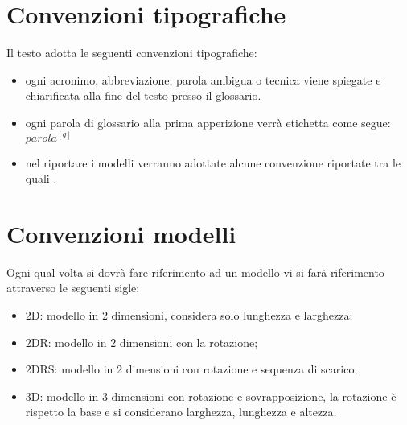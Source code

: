 \section{Convenzioni tipografiche}
Il testo adotta le seguenti convenzioni tipografiche:
\begin{itemize}
    \item ogni acronimo, abbreviazione, parola ambigua o tecnica viene spiegate e chiarificata alla fine del testo presso il glossario.
    \item ogni parola di glossario alla prima apperizione verrà etichetta come segue: $parola^{[g]}$
    \item nel riportare i modelli verranno adottate alcune convenzione riportate tra le quali   .
\end{itemize}
\section{Convenzioni modelli}
Ogni qual volta si dovrà fare riferimento ad un modello vi si farà riferimento attraverso le seguenti sigle:
\begin{itemize}
    \item 2D: modello in 2 dimensioni, considera solo lunghezza e larghezza;
    \item 2DR: modello in 2 dimensioni con la rotazione;
    \item 2DRS: modello in 2 dimensioni con rotazione e sequenza di scarico;
    \item 3D: modello in 3 dimensioni con rotazione e sovrapposizione, la rotazione è rispetto la base e si considerano larghezza, lunghezza e altezza.
\end{itemize}